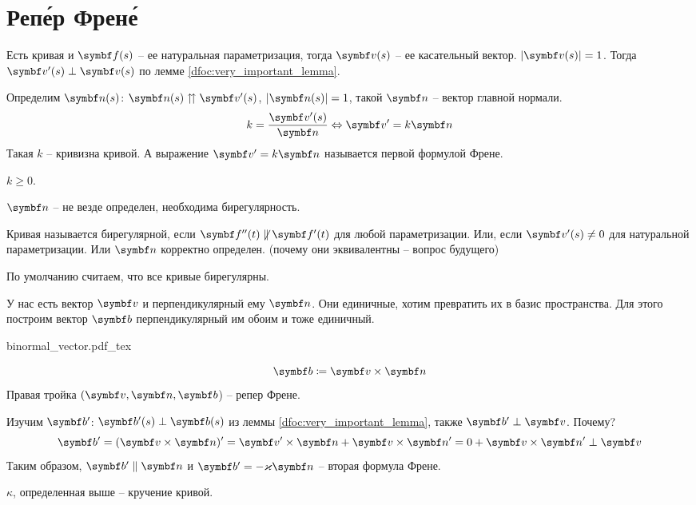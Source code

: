 \documentclass[main]{subfiles}
\begin{document}
\chapter{Реп\'ер Френ\'е}

Есть кривая и $\vf(s)$ -- ее натуральная параметризация, тогда $\vv(s)$ -- ее касательный вектор.
$|\vv(s)| = 1$.
Тогда $\vv'(s) \perp \vv(s)$ по лемме \ref{dfoc:very_important_lemma}.
\begin{definition}
    Определим $\vn(s)$: $\vn(s) \upuparrows \vv'(s)$, $|\vn(s)| = 1$,
    такой $\vn$ -- вектор главной нормали.
    \[k = \frac{\vv ' (s)}{\vn} \Leftrightarrow \vv' = k \vn\]
    Такая $k$ -- кривизна кривой.
    А выражение $\vv' = k \vn$ называется первой формулой Френе.
\end{definition}
\begin{remark}
    $k \ge 0$.
\end{remark}
\begin{remark}
    $\vn$ -- не везде определен, необходима бирегулярность.
\end{remark}

\begin{definition}
    Кривая называется бирегулярной, если $\vf''(t) \not\parallel \vf'(t)$ для любой параметризации.
    Или, если $\vv'(s) \neq 0$ для натуральной параметризации.
    Или $\vn$ корректно определен.
    (почему они эквивалентны -- вопрос будущего)
\end{definition}

По умолчанию считаем, что все кривые бирегулярны.

У нас есть вектор $\vv$ и перпендикулярный ему $\vn$.
Они единичные, хотим превратить их в базис пространства.
Для этого построим вектор $\vb$ перпендикулярный им обоим и тоже единичный.
\begin{center}
    {binormal_vector.pdf_tex}
\end{center}

\begin{definition}
    \[\vb \coloneqq \vv \times \vn\]
    Правая тройка $(\vv,\vn, \vb$) -- репер Френе.
\end{definition}

Изучим $\vb'$:
$\vb'(s) \perp \vb(s)$ из леммы \ref{dfoc:very_important_lemma},
также $\vb' \perp \vv$. Почему?
\[\vb' = (\vv \times \vn)' = \vv' \times \vn + \vv\times \vn' = 0 + \vv\times \vn' \perp \vv\]
Таким образом, $\vb' \parallel \vn$ и $\vb' = -\kappa \vn$ -- вторая формула Френе.
\begin{definition}
    $\kappa$, определенная выше -- кручение кривой.
\end{definition}
\end{document}
